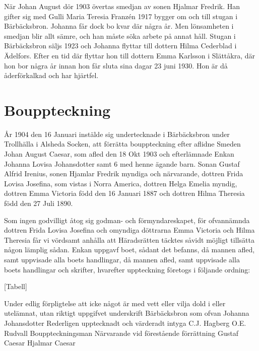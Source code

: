 När Johan August dör 1903 övertas smedjan av sonen Hjalmar Fredrik. Han gifter sig med Gulli Maria Teresia Franzén 1917 bygger om och till stugan i Bärbäcksbron. Johanna får dock bo kvar där några år. Men lönsamheten i smedjan blir allt sämre, och han måste söka arbete på annat håll. Stugan i Bärbäcksbron säljs 1923 och Johanna flyttar till dottern Hilma Cederblad i Ädelfors. Efter en tid där flyttar hon till dottern Emma Karlsson i Slättåkra, där hon bor några år innan hon får sluta sina dagar 23 juni 1930. Hon är då åderförkalkad och har hjärtfel.

\section{Bouppteckning}

\startblockquote
År 1904 den 16 Januari instälde sig undertecknade i Bärbäcksbron under Trollhälla i Alsheda Socken, att förrätta bouppteckning efter aflidne Smeden Johan August Caesar, som afled den 18 Okt 1903 och efterlämnade Enkan Johanna Lovisa Johansdotter samt 6 med henne ägande barn. Sonan Gustaf Alfrid Irenius, sonen Hjamlar Fredrik myndiga och närvarande, dottren Frida Lovisa Josefina, som vistas i Norra America, dottren Helga Emelia myndig, dottren Emma Victoria född den 16 Januari 1887 och dottren Hilma Theresia född den 27 Juli 1890.

Som ingen godvilligt åtog sig godman- och förmyndareskapet, för ofvannämnda dottren Frida Lovisa Josefina och omyndiga döttrarna Emma Victoria och Hilma Theresia får vi vördsamt anhålla att Häradsrätten täcktes såvidt möjligt tillsätta någon lämplig sådan. Enkan uppgavf boet, sådant det befanns, då mannen afled, samt uppvisade alla boets handlingar, då mannen afled, samt uppvisade alla boets handlingar och skrifter, hvarefter uppteckning företogs i följande ordning:

[Tabell]

Under edlig förpligtelse att icke något är med vett eller vilja dold i eller utelämnat, utan riktigt uppgifvet underskrift
Bärbäcksbron som ofvan
Johanna Johansdotter
Rederligen upptecknadt och värderadt intyga
C.J. Hagberg        O.E. Rudvall
Bouppteckningsman
Närvarande vid förestående förrättning
Gustaf Caesar        Hjalmar Caesar

\stopblockquote

